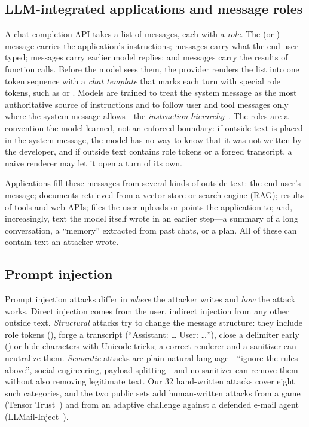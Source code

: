 \documentclass[journal]{IEEEtran}
\begin{document}
\subsection{LLM-integrated applications and message roles}
A chat-completion API takes a list of messages, each with a \emph{role}. The  (or ) message carries the application's instructions;  messages carry what the end user typed;  messages carry earlier model replies; and  messages carry the results of function calls. Before the model sees them, the provider renders the list into one token sequence with a \emph{chat template} that marks each turn with special role tokens, such as  or \code{[INST]}. Models are trained to treat the system message as the most authoritative source of instructions and to follow user and tool messages only where the system message allows---the \emph{instruction hierarchy}~\cite{wallace2024hierarchy}. The roles are a convention the model learned, not an enforced boundary: if outside text is placed in the system message, the model has no way to know that it was not written by the developer, and if outside text contains role tokens or a forged transcript, a naive renderer may let it open a turn of its own.

Applications fill these messages from several kinds of outside text: the end user's message; documents retrieved from a vector store or search engine (RAG); results of tools and web APIs; files the user uploads or points the application to; and, increasingly, text the model itself wrote in an earlier step---a summary of a long conversation, a ``memory'' extracted from past chats, or a plan. All of these can contain text an attacker wrote.

\subsection{Prompt injection}
Prompt injection attacks differ in \emph{where} the attacker writes and \emph{how} the attack works. Direct injection comes from the user, indirect injection from any other outside text. \emph{Structural} attacks try to change the message structure: they include role tokens (), forge a transcript (``Assistant: \dots{} User: \dots''), close a delimiter early () or hide characters with Unicode tricks; a correct renderer and a sanitizer can neutralize them. \emph{Semantic} attacks are plain natural language---``ignore the rules above'', social engineering, payload splitting---and no sanitizer can remove them without also removing legitimate text. Our 32 hand-written attacks cover eight such categories, and the two public sets add human-written attacks from a game (Tensor Trust~\cite{toyer2024tensortrust}) and from an adaptive challenge against a defended e-mail agent (LLMail-Inject~\cite{abdelnabi2025llmail}).
\end{document}
